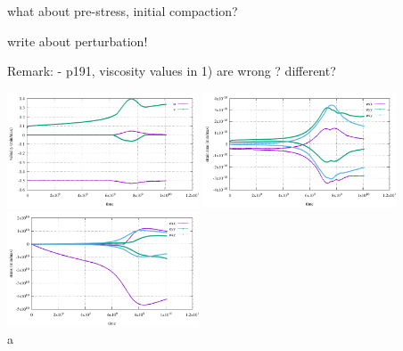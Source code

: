 what about pre-stress, initial compaction?

write about perturbation!

Remark:
- p191, viscosity values in 1) are wrong ? different?



\begin{center}
\includegraphics[width=5.7cm]{python_codes/fieldstone_129/results/experiment1/stats_velocity}
\includegraphics[width=5.7cm]{python_codes/fieldstone_129/results/experiment1/stats_strainrate}
\includegraphics[width=5.7cm]{python_codes/fieldstone_129/results/experiment1/stats_stress}\\
{\captionfont a}
\end{center} 


